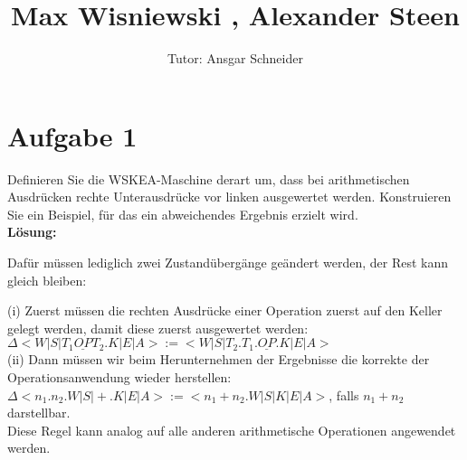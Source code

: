 \documentclass[11pt,a4paper,ngerman]{article}
\author{Tutor: Ansgar Schneider}
\date{}
\title{Max Wisniewski , Alexander Steen}
\begin{document}

\maketitle
\thispagestyle{fancy}



\section*{Aufgabe 1}
Definieren Sie die WSKEA-Maschine derart um, dass bei arithmetischen Ausdrücken rechte Unterausdrücke vor linken ausgewertet werden. Konstruieren Sie ein Beispiel, für das ein abweichendes Ergebnis erzielt wird. \\

\textbf{Lösung:}

Dafür müssen lediglich zwei Zustandübergänge geändert werden, der Rest kann gleich bleiben:

(i) Zuerst müssen die rechten Ausdrücke einer Operation zuerst auf den Keller gelegt werden, damit diese zuerst ausgewertet werden: \\

$ \Delta<W | S | T_1 \underline{OP} T_2.K | E | A> :=
        <W | S | T_2.T_1.\underline{OP}.K | E | A>$ \\

(ii) Dann müssen wir beim Herunternehmen der Ergebnisse die korrekte der Operationsanwendung wieder herstellen:\\

$ \Delta<n_1.n_2.W | S | +.K | E | A> :=
        <n_1+n_2.W | S | K | E | A>$, falls $n_1+n_2$ darstellbar.\\

Diese Regel kann analog auf alle anderen arithmetische Operationen angewendet werden.
\end{document}

